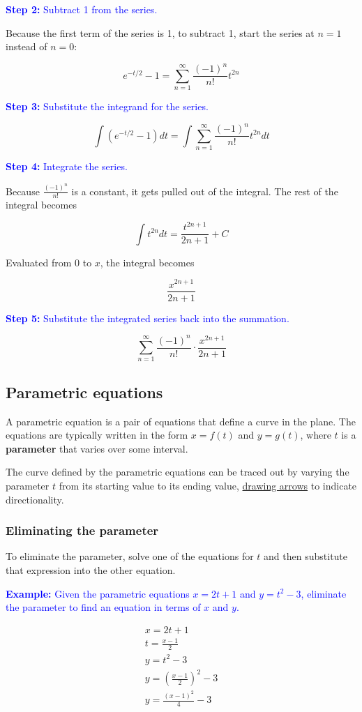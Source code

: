 \documentclass[letterpaper, 12pt]{article}
\newcommand{\example}[1]{\textcolor{blue}{\textbf{Example:} #1}}
\newcommand{\step}[2]{\textcolor{blue}{\textbf{Step #1:} #2}}
\begin{document}
\step{2}{Subtract 1 from the series.}

Because the first term of the series is 1, to subtract 1, start the series at $n=1$ instead of $n=0$:

$$e^{-t/2} - 1 = \sum_{n=1}^\infty \frac{(-1)^n}{n!} t^{2n}$$

\step{3}{Substitute the integrand for the series.}

$$\int (e^{-t/2}-1) dt = \int \sum_{n=1}^\infty \frac{(-1)^n}{n!} t^{2n} dt$$

\step{4}{Integrate the series.}

Because $\displaystyle \frac{(-1)^n}{n!}$ is a constant, it gets pulled out of the integral. The rest of the integral becomes

$$\int t^{2n} dt = \frac{t^{2n+1}}{2n+1} + C$$

Evaluated from 0 to $x$, the integral becomes

$$\frac{x^{2n+1}}{2n+1}$$

\step{5}{Substitute the integrated series back into the summation.}

$$\boxed{\sum_{n=1}^\infty \frac{(-1)^n}{n!} \cdot \frac{x^{2n+1}}{2n+1}}$$

\subsection*{Parametric equations}

A parametric equation is a pair of equations that define a curve in the plane. The equations are typically written in the form $x = f(t)$ and $y = g(t)$, where $t$ is a \textbf{parameter} that varies over some interval.

The curve defined by the parametric equations can be traced out by varying the parameter $t$ from its starting value to its ending value, \underline{drawing arrows} to indicate directionality.

\subsubsection*{Eliminating the parameter}
To eliminate the parameter, solve one of the equations for $t$ and then substitute that expression into the other equation.

\example{Given the parametric equations $x = 2t + 1$ and $y = t^2 - 3$, eliminate the parameter to find an equation in terms of $x$ and $y$.}

\begin{gather*}
x = 2t + 1 \\
t = \frac{x - 1}{2} \\
y = t^2 - 3 \\
y = \left(\frac{x - 1}{2}\right)^2 - 3 \\
\boxed{y = \frac{(x - 1)^2}{4} - 3}
\end{gather*}
\end{document}
